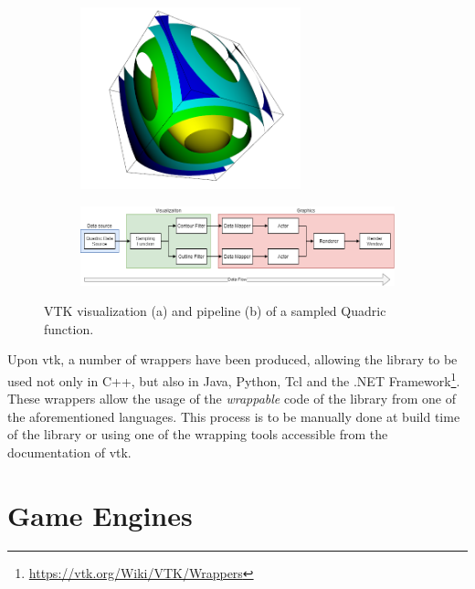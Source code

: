 \begin{figure}
    \centering
    \begin{subfigure}{\textwidth}
        \centering
        \includegraphics[width=0.7\textwidth]{pictures/Quadric-Rendering.PNG}
        \caption{}
    \end{subfigure}
    \begin{subfigure}{\textwidth}
        \includegraphics[width=\textwidth]{pictures/Pipeline-VTK-Quadric.png}
        \caption{}
    \end{subfigure}
    \caption{VTK visualization (a) and pipeline (b) of a sampled Quadric function.}
        \label{fig:quadric-render-pipeline}
\end{figure}

Upon \acrshort{vtk}, a number of wrappers have been produced, allowing the library to be used not only in C++, but also in Java, Python, Tcl and the .NET Framework\footnote{\url{https://vtk.org/Wiki/VTK/Wrappers}}. These wrappers allow the usage of the \textit{wrappable} code of the library from one of the aforementioned languages. This process is to be manually done at build time of the library or using one of the wrapping tools accessible from the documentation of \acrshort{vtk}.

\section{Game Engines}

